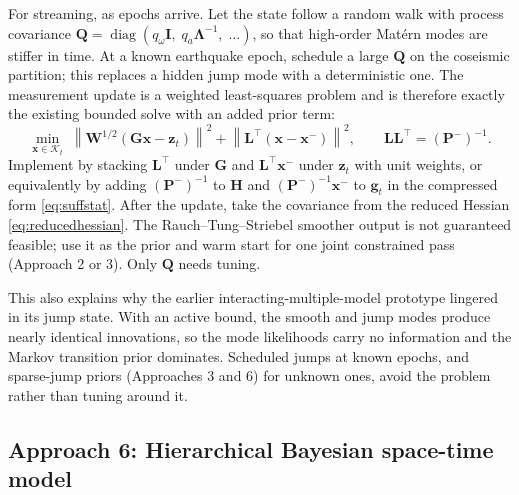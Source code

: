 \documentclass[11pt]{article}
\newcommand{\vect}[1]{\bm{#1}}
\newcommand{\mat}[1]{\mathbf{#1}}
\newcommand{\norm}[1]{\left\lVert #1 \right\rVert}
\DeclareMathOperator{\diag}{diag}
\begin{document}
For streaming, as epochs arrive. Let the state follow a random walk with process covariance $\mat{Q} = \diag(q_\omega\mat{I},\; q_a\mat{\Lambda}^{-1},\;\dots)$, so that high-order Mat\'ern modes are stiffer in time. At a known earthquake epoch, schedule a large $\mat{Q}$ on the coseismic partition; this replaces a hidden jump mode with a deterministic one. The measurement update is a weighted least-squares problem and is therefore exactly the existing bounded solve with an added prior term:
\begin{equation}
\min_{\vect{x} \in \mathcal{K}_t}\; \norm{\mat{W}^{1/2}(\mat{G}\vect{x} - \vect{z}_t)}^2 + \norm{\mat{L}^{\!\top}(\vect{x} - \vect{x}^-)}^2, \qquad \mat{L}\mat{L}^{\!\top} = (\mat{P}^-)^{-1}.
\label{eq:ckf}
\end{equation}
Implement by stacking $\mat{L}^{\!\top}$ under $\mat{G}$ and $\mat{L}^{\!\top}\vect{x}^-$ under $\vect{z}_t$ with unit weights, or equivalently by adding $(\mat{P}^-)^{-1}$ to $\mat{H}$ and $(\mat{P}^-)^{-1}\vect{x}^-$ to $\vect{g}_t$ in the compressed form \eqref{eq:suffstat}. After the update, take the covariance from the reduced Hessian \eqref{eq:reducedhessian}. The Rauch--Tung--Striebel smoother output is not guaranteed feasible; use it as the prior and warm start for one joint constrained pass (Approach 2 or 3). Only $\mat{Q}$ needs tuning.

This also explains why the earlier interacting-multiple-model prototype lingered in its jump state. With an active bound, the smooth and jump modes produce nearly identical innovations, so the mode likelihoods carry no information and the Markov transition prior dominates. Scheduled jumps at known epochs, and sparse-jump priors (Approaches 3 and 6) for unknown ones, avoid the problem rather than tuning around it.

\subsection{Approach 6: Hierarchical Bayesian space-time model}
\end{document}
